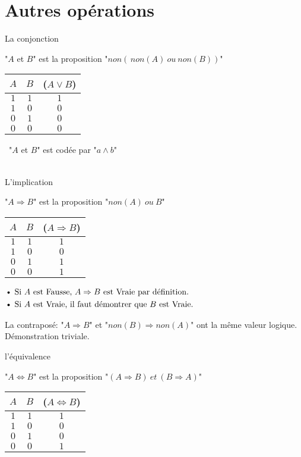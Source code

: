 \documentclass[12pt,twoside,a4paper]{article}
\begin{document}
	\section{Autres op\'erations}
		\begin{liste}
			\item La conjonction
				\begin{defi}"$A$ et $B$" est la proposition "$non(\,non(A)\ ou\ non(B))$"\end{defi}
				\begin{tabular}{ c | c | c  }
					$A$ & $B$ &($A\vee B$)\\\hline 
					$1$&$1$&$1$\\
					$1$&$0$&$0$\\
					$0$&$1$&$0$\\
					$0$&$0$&$0$\\
				\end{tabular} \textbullet\ "$A$ et $B$" est cod\'ee par "$a\land b$"\\\\
			\item L'implication 
				\begin{defi}"$A\Rightarrow B$" est la proposition "$non(A)\ ou\ B$"\end{defi}
				\begin{tabular}{ c | c | c  }
					$A$ & $B$ &($A\Rightarrow B$)\\\hline 
					$1$&$1$&$1$\\
					$1$&$0$&$0$\\
					$0$&$1$&$1$\\
					$0$&$0$&$1$\\
				\end{tabular}
				$\begin{aligned}
					&\text{\textbullet}\ \text{Si }A\text{ est Fausse, }A\Rightarrow B\text{ est Vraie par d\'efinition.}\\
					&\text{\textbullet}\ \text{Si }A\text{ est Vraie, il faut d\'emontrer que }B\text{ est Vraie.}
				\end{aligned}$\pagebreak
			\item La contrapos\'e: "$A\Rightarrow B$" et "$non(B)\Rightarrow non(A)$" ont la m\^eme valeur logique.\\
				D\'emonstration triviale.\\
			\item l'\'equivalence
				\begin{defi}"$A\Leftrightarrow B$" est la proposition "$(A\Rightarrow B)\ et\ (B\Rightarrow A)$" \end{defi}
				\begin{tabular}{ c | c | c  }
					$A$ & $B$ &($A\Leftrightarrow B$)\\\hline 
					$1$&$1$&$1$\\
					$1$&$0$&$0$\\
					$0$&$1$&$0$\\
					$0$&$0$&$1$\\
				\end{tabular}
		\end{liste}
\end{document}
